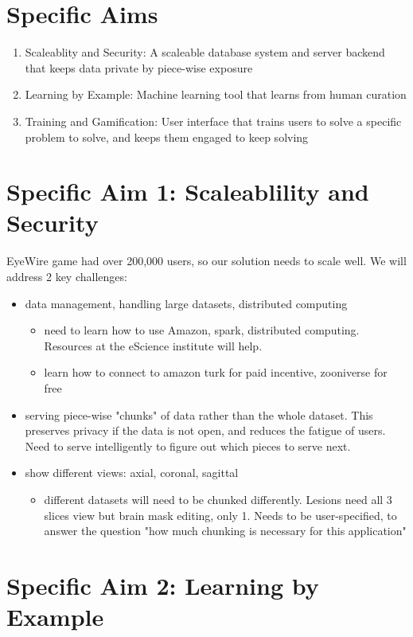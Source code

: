 \section{Specific Aims}
\begin{enumerate}
\item Scaleablity and Security: A scaleable database system and server backend that keeps data private by piece-wise exposure
\item Learning by Example: Machine learning tool that learns from human curation
\item Training and Gamification: User interface that trains users to solve a specific problem to solve, and keeps them engaged to keep solving
\end{enumerate}

\section{Specific Aim 1: Scaleablility and Security}
EyeWire game had over 200,000 users, so our solution needs to scale well. 
We will address 2 key challenges:
\begin{itemize}
\item data management, handling large datasets, distributed computing 
\begin{itemize}
\item need to learn how to use Amazon, spark, distributed computing. Resources at the eScience institute will help. 
\item learn how to connect to amazon turk for paid incentive, zooniverse for free
\end{itemize}
\item serving piece-wise "chunks" of data rather than the whole dataset. This preserves privacy if the data is not open, and reduces the fatigue of users. Need to serve intelligently to figure out which pieces to serve next.
\item show different views: axial, coronal, sagittal
\begin{itemize}
\item different datasets will need to be chunked differently. Lesions need all 3 slices view but brain mask editing, only 1. Needs to be user-specified, to answer the question "how much chunking is necessary for this application"
\end{itemize}
\end{itemize}

\section{Specific Aim 2: Learning by Example}

